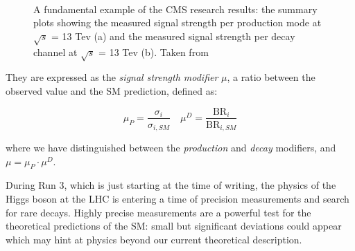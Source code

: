 \begin{figure}
    \myfloatalign
     \quad
     \\
    \caption[Signal strength modifiers]{A fundamental example of the CMS research results: the summary plots showing the measured signal strength per
    production mode at $\sqrt{s}$ = 13 Tev (a) and the measured signal
    strength per decay channel at $\sqrt{s}$ = 13 Tev (b). Taken from \cite{higgsrevcms}}\label{fig:sigsm}
\end{figure}

They are expressed as the \emph{signal strength modifier} $\mu$, a ratio between the observed value and  the SM prediction, defined as:

\[
\mu_P = \frac{\sigma_i}{\sigma_{i, SM}} \quad \mu^D = \frac{\text{BR}_i}{\text{BR}_{i, SM}}
\]

where we have distinguished between the \emph{production} and \emph{decay} modifiers, and $\mu = \mu_P \cdot \mu^D$.

During Run 3, which is just starting at the time of writing, the
physics of the Higgs boson at the LHC is entering a time of precision measurements and
search for rare decays. Highly precise measurements are a powerful test for the theoretical predictions of the SM: small but significant deviations could appear which may hint at physics beyond our current theoretical description.


